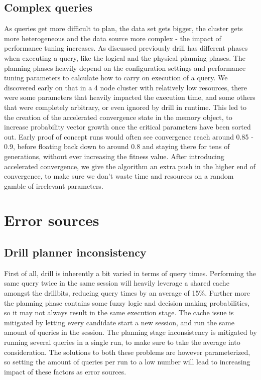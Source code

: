 \documentclass[a4paper,english]{report}
\begin{document}
		\subsection{Complex queries}
		As queries get more difficult to plan, the data set gets bigger, the cluster gets more heterogeneous and the data source more complex - the impact of performance tuning increases. As discussed previously drill has different phases when executing a query, like the logical and the physical planning phases. The planning phases heavily depend on the configuration settings and performance tuning parameters to calculate how to carry on execution of a query. We discovered early on that in a 4 node cluster with relatively low resources, there were some parameters that heavily impacted the execution time, and some others that were completely arbitrary, or even ignored by drill in runtime. This led to the creation of the accelerated convergence state in the memory object, to increase probability vector growth once the critical parameters have been sorted out. Early proof of concept runs would often see convergence reach around 0.85 - 0.9, before floating back down to around 0.8 and staying there for tens of generations, without ever increasing the fitness value. After introducing accelerated convergence, we give the algorithm an extra push in the higher end of convergence, to make sure we don't waste time and resources on a random gamble of irrelevant parameters.
	\section{Error sources}
		\subsection{Drill planner inconsistency}
		First of all, drill is inherently a bit varied in terms of query times. Performing the same query twice in the same session will heavily leverage a shared cache amongst the drillbits, reducing query times by an average of 15\%. Further more the planning phase contains some fuzzy logic and decision making probabilities, so it may not always result in the same execution stage. The cache issue is mitigated by letting every candidate start a new session, and run the same amount of queries in the session. The planning stage inconsistency is mitigated by running several queries in a single run, to make sure to take the average into consideration. The solutions to both these problems are however parameterized, so setting the amount of queries per run to a low number will lead to increasing impact of these factors as error sources.
\end{document}
